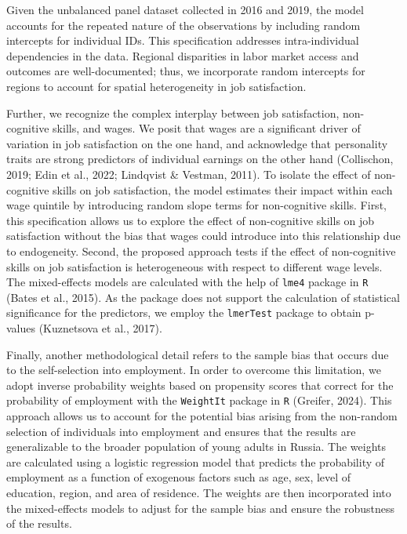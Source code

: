 \documentclass[
]{interact}
\begin{document}
Given the unbalanced panel dataset collected in 2016 and 2019, the model
accounts for the repeated nature of the observations by including random
intercepts for individual IDs. This specification addresses
intra-individual dependencies in the data. Regional disparities in labor
market access and outcomes are well-documented; thus, we incorporate
random intercepts for regions to account for spatial heterogeneity in
job satisfaction.

Further, we recognize the complex interplay between job satisfaction,
non-cognitive skills, and wages. We posit that wages are a significant
driver of variation in job satisfaction on the one hand, and acknowledge
that personality traits are strong predictors of individual earnings on
the other hand (Collischon, 2019; Edin et al., 2022; Lindqvist \&
Vestman, 2011). To isolate the effect of non-cognitive skills on job
satisfaction, the model estimates their impact within each wage quintile
by introducing random slope terms for non-cognitive skills. First, this
specification allows us to explore the effect of non-cognitive skills on
job satisfaction without the bias that wages could introduce into this
relationship due to endogeneity. Second, the proposed approach tests if
the effect of non-cognitive skills on job satisfaction is heterogeneous
with respect to different wage levels. The mixed-effects models are
calculated with the help of \texttt{lme4} package in \texttt{R} (Bates
et al., 2015). As the package does not support the calculation of
statistical significance for the predictors, we employ the
\texttt{lmerTest} package to obtain p-values (Kuznetsova et al., 2017).

Finally, another methodological detail refers to the sample bias that
occurs due to the self-selection into employment. In order to overcome
this limitation, we adopt inverse probability weights based on
propensity scores that correct for the probability of employment with
the \texttt{WeightIt} package in \texttt{R} (Greifer, 2024). This
approach allows us to account for the potential bias arising from the
non-random selection of individuals into employment and ensures that the
results are generalizable to the broader population of young adults in
Russia. The weights are calculated using a logistic regression model
that predicts the probability of employment as a function of exogenous
factors such as age, sex, level of education, region, and area of
residence. The weights are then incorporated into the mixed-effects
models to adjust for the sample bias and ensure the robustness of the
results.
\end{document}
